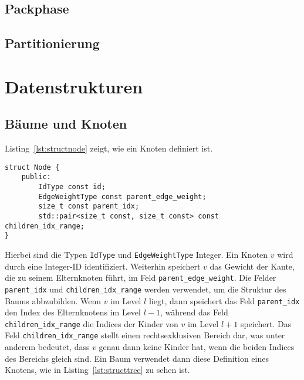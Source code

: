 \subsection{Packphase}
\subsection{Partitionierung}

\section{Datenstrukturen}
\subsection{Bäume und Knoten}
Listing~\ref{lst:structnode} zeigt, wie ein Knoten definiert ist.
\begin{lstlisting}[caption={Definition von \texttt{struct Node}}, label={lst:structnode}]
struct Node {
    public:
        IdType const id;
        EdgeWeightType const parent_edge_weight;
        size_t const parent_idx;
        std::pair<size_t const, size_t const> const children_idx_range;
}
\end{lstlisting}

Hierbei sind die Typen \texttt{IdType} und \texttt{EdgeWeightType} Integer.
Ein Knoten $v$ wird durch eine Integer-ID identifiziert. 
Weiterhin speichert $v$ das Gewicht der Kante, die zu seinem Elternknoten führt, im Feld \texttt{parent\_edge\_weight}.
Die Felder \texttt{parent\_idx} und \texttt{children\_idx\_range} werden verwendet, um die Struktur des Baums abbzubilden.
Wenn $v$ im Level $l$ liegt, dann speichert das Feld \texttt{parent\_idx} den Index des Elternknotens im Level $l-1$, während das Feld \texttt{children\_idx\_range} die Indices der Kinder von $v$ im Level $l+1$ speichert.
Das Feld \texttt{children\_idx\_range} stellt einen rechtsexklusiven Bereich dar, was unter anderem bedeutet, dass $v$ genau dann keine Kinder hat, wenn die beiden Indices des Bereichs gleich sind.
Ein Baum verwendet dann diese Definition eines Knotens, wie in Listing~\ref{lst:structtree} zu sehen ist.

